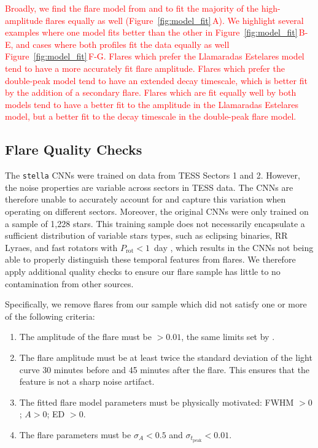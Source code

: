 \documentclass[twocolumn, linenumbers]{aastex631}
\begin{document}
\textcolor{red}{Broadly, we find the flare model from \cite{tovar22} and \cite{pietras22}
to fit the majority of the high-amplitude flares equally as well (Figure~\ref{fig:model_fit}\,A).
We highlight several examples where one model fits better than the other in Figure~\ref{fig:model_fit}\,B-E,
and cases where both profiles fit the data equally as well Figure~\ref{fig:model_fit}\,F-G.
Flares which prefer the Llamaradas Estelares model tend to have a more accurately fit flare
amplitude. Flares which prefer the double-peak model tend to have an extended decay timescale,
which is better fit by the addition of a secondary flare. Flares which are fit equally well by
both models tend to have a better fit to the amplitude in the Llamaradas Estelares model, but a
better fit to the decay timescale in the double-peak flare model.}


\subsection{Flare Quality Checks}\label{subsec2:qualitychecks}

The \texttt{stella} CNNs were trained on data from TESS Sectors 1 and 2. However, the
noise properties are variable across sectors in TESS data. The CNNs are therefore unable
to accurately account for and capture  this variation when operating on different sectors.
Moreover, the original CNNs were only trained on a sample of 1,228 stars. This training
sample does not necessarily encapsulate a sufficient distribution  of variable stars types,
such as eclipsing binaries, RR Lyraes, and fast rotators with $P_\textrm{rot} < 1$~day
\citep{lawson19}, which results in the CNNs not being able to properly distinguish these
temporal features from flares. We therefore apply additional quality checks to ensure our
flare sample has little to no contamination from other sources.

Specifically, we remove flares from our sample which did not satisfy  one or more of the following criteria:
\begin{enumerate}
    \item  The amplitude of the flare must be $> 0.01$, the same limits set by \cite{feinstein20}.
    \item The flare amplitude  must be at least twice the standard deviation of the light curve
    30 minutes before and 45 minutes after the flare. This ensures that the feature is not a sharp noise artifact.
    \item  The fitted flare model parameters must be physically motivated: FWHM $> 0$; $A > 0$; ED $> 0$.
    \item The flare parameters must be $\sigma_A < 0.5$ and $\sigma_{t_\textrm{peak}} < 0.01$.
\end{enumerate}
\end{document}
